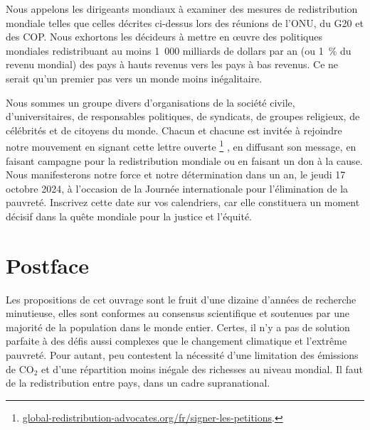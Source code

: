 \documentclass[a5paper,french,openany]{memoir}
\begin{document}
Nous appelons les dirigeants mondiaux à examiner des mesures de redistribution mondiale telles que celles décrites ci-dessus lors des réunions de l'ONU, du G20 et des COP. Nous exhortons les décideurs à mettre en œuvre des politiques mondiales redistribuant au moins 1~000 milliards de dollars par an (ou 1~\% du revenu mondial) des pays à hauts revenus vers les pays à bas revenus. Ce ne serait qu'un premier pas vers un monde moins inégalitaire.

Nous sommes un groupe divers d'organisations de la société civile, d'universitaires, de responsables politiques, de syndicats, de groupes religieux, de célébrités et de citoyens du monde. Chacun et chacune est invitée à rejoindre notre mouvement en signant cette lettre ouverte
\footnote{\href{https://global-redistribution-advocates.org/fr/signer-les-petitions/?238=true}{global-redistribution-advocates.org/fr/signer-les-petitions}.}%
, en diffusant son message, en faisant campagne pour la redistribution mondiale ou en faisant un don à la cause. Nous manifesterons notre force et notre détermination dans un an, le jeudi 17 octobre 2024, à l'occasion de la Journée internationale pour l'élimination de la pauvreté. Inscrivez cette date sur vos calendriers, car elle constituera un moment décisif dans la quête mondiale pour la justice et l'équité.

\chapter{Postface}

Les propositions de cet ouvrage sont le fruit d'une dizaine d'années de recherche minutieuse, elles sont conformes au consensus scientifique et soutenues par une majorité de la population dans le monde entier. 
Certes, il n'y a pas de solution parfaite à des défis aussi complexes que le changement climatique et l'extrême pauvreté. 
Pour autant, peu contestent la nécessité d'une limitation des émissions de CO$_\text{2}$ et  %
d'une répartition moins inégale des richesses au niveau mondial. Il faut de la redistribution entre pays, dans un cadre supranational. 
\end{document}
